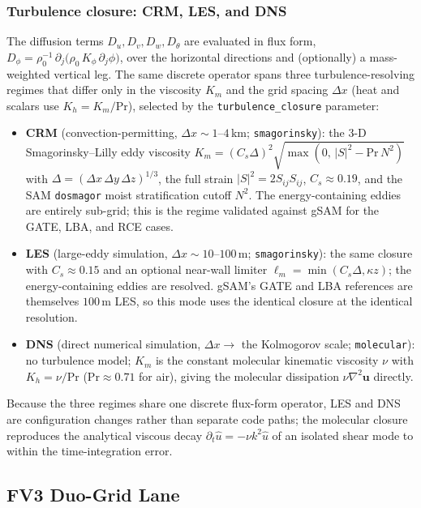 \documentclass[11pt,a4paper]{article}
\begin{document}
\subsubsection{Turbulence closure: CRM, LES, and DNS}
The diffusion terms $D_u,D_v,D_w,D_\theta$ are evaluated in flux form, $D_\phi = \rho_0^{-1}\,\partial_j\!\bigl(\rho_0\,K_\phi\,\partial_j\phi\bigr)$, over the horizontal directions and (optionally) a mass-weighted vertical leg.  The same discrete operator spans three turbulence-resolving regimes that differ only in the viscosity $K_m$ and the grid spacing $\Delta x$ (heat and scalars use $K_h=K_m/\mathrm{Pr}$), selected by the \texttt{turbulence\_closure} parameter:
\begin{itemize}
  \item \textbf{CRM} (convection-permitting, $\Delta x\sim1$--$4$\,km; \texttt{smagorinsky}): the 3-D Smagorinsky--Lilly eddy viscosity \citep{Smagorinsky1963} $K_m=(C_s\Delta)^2\sqrt{\max(0,\,|S|^2-\mathrm{Pr}\,N^2)}$ with $\Delta=(\Delta x\,\Delta y\,\Delta z)^{1/3}$, the full strain $|S|^2=2S_{ij}S_{ij}$, $C_s\approx0.19$, and the SAM \texttt{dosmagor} moist stratification cutoff $N^2$.  The energy-containing eddies are entirely sub-grid; this is the regime validated against gSAM for the GATE, LBA, and RCE cases.
  \item \textbf{LES} (large-eddy simulation, $\Delta x\sim10$--$100$\,m; \texttt{smagorinsky}): the same closure with $C_s\approx0.15$ and an optional near-wall limiter $\ell_m=\min(C_s\Delta,\kappa z)$; the energy-containing eddies are resolved.  gSAM's GATE and LBA references are themselves $100$\,m LES, so this mode uses the identical closure at the identical resolution.
  \item \textbf{DNS} (direct numerical simulation, $\Delta x\to$ the Kolmogorov scale; \texttt{molecular}): no turbulence model; $K_m$ is the constant molecular kinematic viscosity $\nu$ with $K_h=\nu/\mathrm{Pr}$ ($\mathrm{Pr}\approx0.71$ for air), giving the molecular dissipation $\nu\nabla^2\bm u$ directly.
\end{itemize}
Because the three regimes share one discrete flux-form operator, LES and DNS are configuration changes rather than separate code paths; the molecular closure reproduces the analytical viscous decay $\partial_t\hat u=-\nu k^2\hat u$ of an isolated shear mode to within the time-integration error.

\subsection{FV3 Duo-Grid Lane}
\label{sec:fv3duo}
\end{document}
